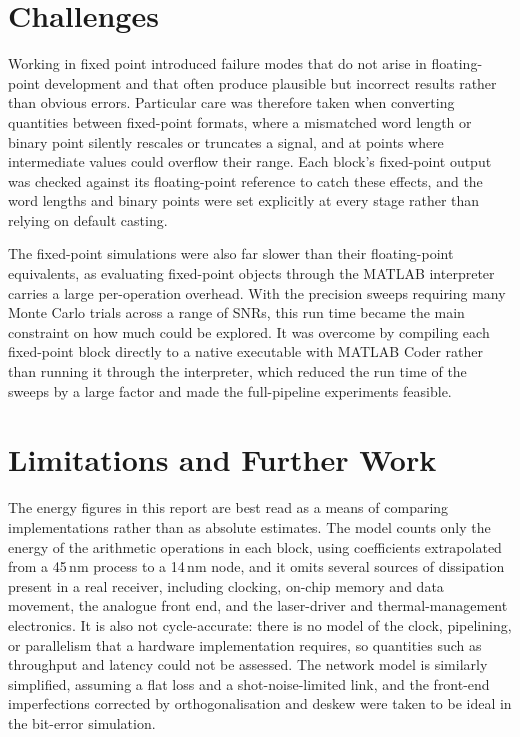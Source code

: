 \documentclass[12pt,a4paper]{report}
\begin{document}
\section{Challenges}
Working in fixed point introduced failure modes that do not arise in floating-point development and that often produce plausible but incorrect results rather than obvious errors. Particular care was therefore taken when converting quantities between fixed-point formats, where a mismatched word length or binary point silently rescales or truncates a signal, and at points where intermediate values could overflow their range. Each block's fixed-point output was checked against its floating-point reference to catch these effects, and the word lengths and binary points were set explicitly at every stage rather than relying on default casting.

The fixed-point simulations were also far slower than their floating-point equivalents, as evaluating fixed-point objects through the MATLAB interpreter carries a large per-operation overhead. With the precision sweeps requiring many Monte Carlo trials across a range of SNRs, this run time became the main constraint on how much could be explored. It was overcome by compiling each fixed-point block directly to a native executable with MATLAB Coder rather than running it through the interpreter, which reduced the run time of the sweeps by a large factor and made the full-pipeline experiments feasible.

\section{Limitations and Further Work}
The energy figures in this report are best read as a means of comparing implementations rather than as absolute estimates. The model counts only the energy of the arithmetic operations in each block, using coefficients extrapolated from a 45\,nm process to a 14\,nm node, and it omits several sources of dissipation present in a real receiver, including clocking, on-chip memory and data movement, the analogue front end, and the laser-driver and thermal-management electronics. It is also not cycle-accurate: there is no model of the clock, pipelining, or parallelism that a hardware implementation requires, so quantities such as throughput and latency could not be assessed. The network model is similarly simplified, assuming a flat loss and a shot-noise-limited link, and the front-end imperfections corrected by orthogonalisation and deskew were taken to be ideal in the bit-error simulation.
\end{document}
